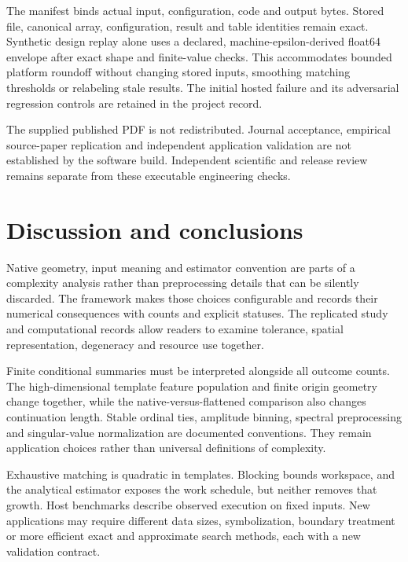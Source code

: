 \documentclass[
  english,
  11pt,
]{article}
\begin{document}
\endgroup

The manifest binds actual input, configuration, code and output bytes.
Stored file, canonical array, configuration, result and table identities
remain exact. Synthetic design replay alone uses a declared,
machine-epsilon-derived float64 envelope after exact shape and
finite-value checks. This accommodates bounded platform roundoff without
changing stored inputs, smoothing matching thresholds or relabeling
stale results. The initial hosted failure and its adversarial regression
controls are retained in the project record.

The supplied published PDF is not redistributed. Journal acceptance,
empirical source-paper replication and independent application
validation are not established by the software build. Independent
scientific and release review remains separate from these executable
engineering checks.

\section{Discussion and conclusions}\label{sec:conclusion}

Native geometry, input meaning and estimator convention are parts of a
complexity analysis rather than preprocessing details that can be
silently discarded. The framework makes those choices configurable and
records their numerical consequences with counts and explicit statuses.
The replicated study and computational records allow readers to examine
tolerance, spatial representation, degeneracy and resource use together.

Finite conditional summaries must be interpreted alongside all outcome
counts. The high-dimensional template feature population and finite
origin geometry change together, while the native-versus-flattened
comparison also changes continuation length. Stable ordinal ties,
amplitude binning, spectral preprocessing and singular-value
normalization are documented conventions. They remain application
choices rather than universal definitions of complexity.

Exhaustive matching is quadratic in templates. Blocking bounds
workspace, and the analytical estimator exposes the work schedule, but
neither removes that growth. Host benchmarks describe observed execution
on fixed inputs. New applications may require different data sizes,
symbolization, boundary treatment or more efficient exact and
approximate search methods, each with a new validation contract.
\end{document}
